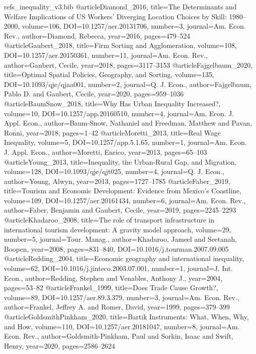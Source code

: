 \begin{filecontents*}[overwrite]{refs_inequality_v3.bib}
@article{Diamond_2016, title={The Determinants and Welfare Implications of {US} Workers' Diverging Location Choices by Skill: 1980--2000}, volume={106}, DOI={10.1257/aer.20131706}, number={3}, journal={Am. Econ. Rev.}, author={Diamond, Rebecca}, year={2016}, pages={479--524} }
@article{Gaubert_2018, title={Firm Sorting and Agglomeration}, volume={108}, DOI={10.1257/aer.20150361}, number={11}, journal={Am. Econ. Rev.}, author={Gaubert, Cecile}, year={2018}, pages={3117--3153} }
@article{Fajgelbaum_2020, title={Optimal Spatial Policies, Geography, and Sorting}, volume={135}, DOI={10.1093/qje/qjaa001}, number={2}, journal={Q. J. Econ.}, author={Fajgelbaum, Pablo D. and Gaubert, Cecile}, year={2020}, pages={959--1036} }
@article{BaumSnow_2018, title={Why Has Urban Inequality Increased?}, volume={10}, DOI={10.1257/app.20160510}, number={4}, journal={Am. Econ. J. Appl. Econ.}, author={Baum-Snow, Nathaniel and Freedman, Matthew and Pavan, Ronni}, year={2018}, pages={1--42} }
@article{Moretti_2013, title={Real Wage Inequality}, volume={5}, DOI={10.1257/app.5.1.65}, number={1}, journal={Am. Econ. J. Appl. Econ.}, author={Moretti, Enrico}, year={2013}, pages={65--103} }
@article{Young_2013, title={Inequality, the Urban-Rural Gap, and Migration}, volume={128}, DOI={10.1093/qje/qjt025}, number={4}, journal={Q. J. Econ.}, author={Young, Alwyn}, year={2013}, pages={1727--1785} }
@article{Faber_2019, title={Tourism and Economic Development: Evidence from {Mexico}'s Coastline}, volume={109}, DOI={10.1257/aer.20161434}, number={6}, journal={Am. Econ. Rev.}, author={Faber, Benjamin and Gaubert, Cecile}, year={2019}, pages={2245--2293} }
@article{Khadaroo_2008, title={The role of transport infrastructure in international tourism development: A gravity model approach}, volume={29}, number={5}, journal={Tour. Manag.}, author={Khadaroo, Jameel and Seetanah, Boopen}, year={2008}, pages={831--840}, DOI={10.1016/j.tourman.2007.09.005} }
@article{Redding_2004, title={Economic geography and international inequality}, volume={62}, DOI={10.1016/j.jinteco.2003.07.001}, number={1}, journal={J. Int. Econ.}, author={Redding, Stephen and Venables, Anthony J.}, year={2004}, pages={53--82} }
@article{Frankel_1999, title={Does Trade Cause Growth?}, volume={89}, DOI={10.1257/aer.89.3.379}, number={3}, journal={Am. Econ. Rev.}, author={Frankel, Jeffrey A. and Romer, David}, year={1999}, pages={379--399} }
@article{GoldsmithPinkham_2020, title={{Bartik} Instruments: What, When, Why, and How}, volume={110}, DOI={10.1257/aer.20181047}, number={8}, journal={Am. Econ. Rev.}, author={Goldsmith-Pinkham, Paul and Sorkin, Isaac and Swift, Henry}, year={2020}, pages={2586--2624} }

\end{filecontents*}
